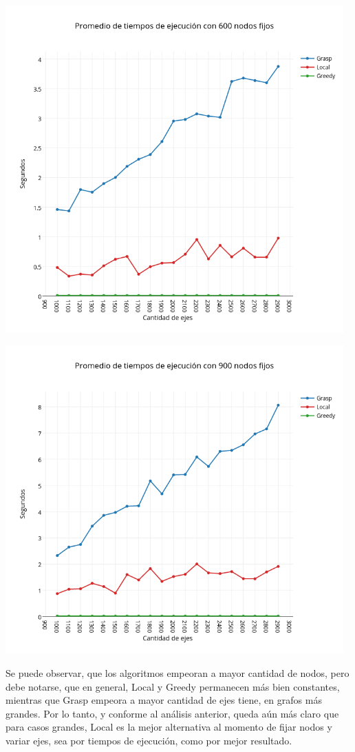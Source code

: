 \begin{center}
 	\includegraphics[width=13cm, keepaspectratio=yes]{imagenes/coliseo/Fixnode/600.png}

 	\includegraphics[width=13cm, keepaspectratio=yes]{imagenes/coliseo/Fixnode/900.png}
\end{center}

Se puede observar, que los algoritmos empeoran a mayor cantidad de nodos, pero debe notarse, que en general, Local y Greedy permanecen más bien constantes, mientras que Grasp empeora a mayor cantidad de ejes tiene, en grafos más grandes. 
Por lo tanto, y conforme al análisis anterior, queda aún más claro que para casos grandes, Local es la mejor alternativa al momento de fijar nodos y variar ejes, sea por tiempos de ejecución, como por mejor resultado.

